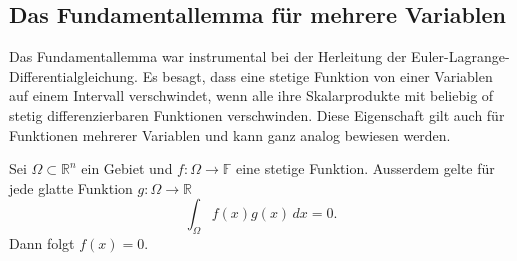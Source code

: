 %
%
%

%
%
\subsection{Das Fundamentallemma für mehrere Variablen}
Das Fundamentallemma war instrumental bei der Herleitung der
Euler-Lagrange-Differentialgleichung.
Es besagt, dass eine stetige Funktion von einer Variablen auf einem Intervall
verschwindet, wenn alle ihre Skalarprodukte mit beliebig of stetig
differenzierbaren Funktionen verschwinden.
Diese Eigenschaft gilt auch für Funktionen mehrerer Variablen und kann
ganz analog bewiesen werden.

\begin{satz}[Fundamentallemma]
Sei $\Omega\subset\mathbb{R}^n$ ein Gebiet und $f\colon \Omega\to\mathbb{F}$
eine stetige Funktion.
Ausserdem gelte für jede glatte Funktion $g\colon\Omega\to\mathbb{R}$ 
\begin{equation}
\int_{\Omega} f(x)g(x)\,dx = 0.
\label{buch:felder:fundamentallemma:eqn:bedfundamentallemma}
\end{equation}
Dann folgt $f(x)=0$.
\end{satz}

